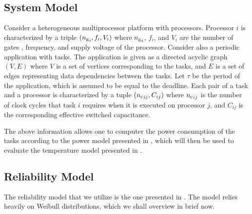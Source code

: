 \subsection{System Model}

Consider a heterogeneous multiprocessor platform with \np processors. Processor
$i$ is characterized by a triple $({n_\mathrm{g}}_i, f_i, V_i)$ where
${n_\mathrm{g}}_i$, $f_i$, and $V_i$ are the number of gates \cite{liao2005},
frequency, and supply voltage of the processor. Consider also a periodic
application with \nt tasks. The application is given as a directed acyclic graph
$(V, E)$ where $V$ is a set of vertices corresponding to the tasks, and $E$ is a
set of edges representing data dependencies between the tasks. Let $\tau$ be the
period of the application, which is assumed to be equal to the deadline. Each
pair of a task and a processor is characterized by a tuple $({n_\mathrm{c}}_{ij},
C_{ij})$ where ${n_\mathrm{c}}_{ij}$ is the number of clock cycles that task $i$
requires when it is executed on processor $j$, and $C_{ij}$ is the corresponding
effective switched capacitance.

The above information allows one to computer the power consumption of the tasks
according to the power model presented in , which will then be
used to evaluate the temperature model presented in .

\subsection{Reliability Model}

The reliability model that we utilize is the one presented in \cite{huang2009,
xiang2010}. The model relies heavily on Weibull distributions, which we shall
overview in brief now.

